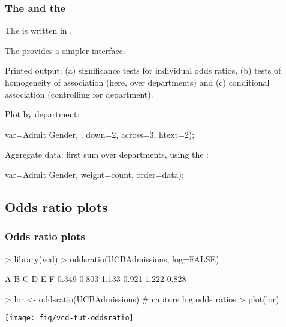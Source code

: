 \begin{frame}[fragile]

\frametitle{The  and the }
  \begin{itemize*}
  \item The  is written in \IML.
  \item The  provides a simpler interface.
  \item Printed output: (a) significance tests for individual odds ratios,
  (b) tests of homogeneity of association (here, over departments) and
  (c) conditional association (controlling for department).
  \end{itemize*}
Plot by department:
\begin{Input}[fontsize=\small,label=\fbox{\texttt{berk4f.sas}},baselinestretch=0.8]

   var=Admit Gender,        
   ,                
   down=2, across=3,       
   htext=2);               
\end{Input}
Aggregate data: first sum over departments,
using the :
\begin{Input}[fontsize=\small,baselinestretch=0.9,firstnumber=8]
   var=Admit Gender,       
   weight=count,           
   order=data);
\end{Input}
\end{frame}

\subsection{Odds ratio plots}
\begin{frame}[fragile]
\frametitle{Odds ratio plots}
\begin{Rin}
> library(vcd)
> oddsratio(UCBAdmissions, log=FALSE)
\end{Rin}
\begin{Rout}
    A     B     C     D     E     F 
0.349 0.803 1.133 0.921 1.222 0.828 
\end{Rout}
\begin{Rin}
> lor <- oddsratio(UCBAdmissions)  # capture log odds ratios
> plot(lor)
\end{Rin}
\begin{center}
   \texttt{[image: fig/vcd-tut-oddsratio]}
\end{center}

\end{frame}
